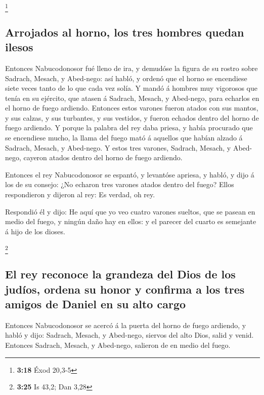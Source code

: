 \footnote{\textbf{3:18} Éxod 20,3-5}

\hypertarget{arrojados-al-horno-los-tres-hombres-quedan-ilesos}{%
\subsection{Arrojados al horno, los tres hombres quedan
ilesos}\label{arrojados-al-horno-los-tres-hombres-quedan-ilesos}}

 Entonces Nabucodonosor fué lleno de ira, y demudóse la
figura de su rostro sobre Sadrach, Mesach, y Abed-nego: así habló, y
ordenó que el horno se encendiese siete veces tanto de lo que cada vez
solía.  Y mandó á hombres muy vigorosos que tenía en su
ejército, que atasen á Sadrach, Mesach, y Abed-nego, para echarlos en el
horno de fuego ardiendo.  Entonces estos varones fueron
atados con sus mantos, y sus calzas, y sus turbantes, y sus vestidos, y
fueron echados dentro del horno de fuego ardiendo.  Y
porque la palabra del rey daba priesa, y había procurado que se
encendiese mucho, la llama del fuego mató á aquellos que habían alzado á
Sadrach, Mesach, y Abed-nego.  Y estos tres varones,
Sadrach, Mesach, y Abed-nego, cayeron atados dentro del horno de fuego
ardiendo.

 Entonces el rey Nabucodonosor se espantó, y levantóse
apriesa, y habló, y dijo á los de su consejo: ¿No echaron tres varones
atados dentro del fuego? Ellos respondieron y dijeron al rey: Es verdad,
oh rey.

 Respondió él y dijo: He aquí que yo veo cuatro varones
sueltos, que se pasean en medio del fuego, y ningún daño hay en ellos: y
el parecer del cuarto es semejante á hijo de los dioses.

\footnote{\textbf{3:25} Is 43,2; Dan 3,28}

\hypertarget{el-rey-reconoce-la-grandeza-del-dios-de-los-juduxedos-ordena-su-honor-y-confirma-a-los-tres-amigos-de-daniel-en-su-alto-cargo}{%
\subsection{El rey reconoce la grandeza del Dios de los judíos, ordena
su honor y confirma a los tres amigos de Daniel en su alto
cargo}\label{el-rey-reconoce-la-grandeza-del-dios-de-los-juduxedos-ordena-su-honor-y-confirma-a-los-tres-amigos-de-daniel-en-su-alto-cargo}}

 Entonces Nabucodonosor se acercó á la puerta del horno
de fuego ardiendo, y habló y dijo: Sadrach, Mesach, y Abed-nego, siervos
del alto Dios, salid y venid. Entonces Sadrach, Mesach, y Abed-nego,
salieron de en medio del fuego.


